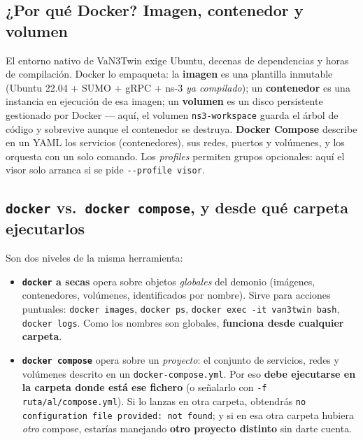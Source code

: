 \documentclass[11pt,a4paper]{article}
\begin{document}
\subsection{¿Por qué Docker? Imagen, contenedor y volumen}

El entorno nativo de VaN3Twin exige Ubuntu, decenas de dependencias y horas
de compilación. Docker lo empaqueta: la \textbf{imagen} es una plantilla
inmutable (Ubuntu 22.04 + SUMO + gRPC + ns-3 \emph{ya compilado}); un
\textbf{contenedor} es una instancia en ejecución de esa imagen; un
\textbf{volumen} es un disco persistente gestionado por Docker --- aquí, el
volumen \texttt{ns3-workspace} guarda el árbol de código y sobrevive aunque
el contenedor se destruya. \textbf{Docker Compose} describe en un YAML los
servicios (contenedores), sus redes, puertos y volúmenes, y los orquesta con
un solo comando. Los \emph{profiles} permiten grupos opcionales: aquí el
visor solo arranca si se pide \texttt{-{}-profile visor}.

\subsection{\texttt{docker} vs.\ \texttt{docker compose}, y desde qué carpeta ejecutarlos}

Son dos niveles de la misma herramienta:

\begin{itemize}[leftmargin=1.6em, itemsep=2pt]
  \item \textbf{\texttt{docker} a secas} opera sobre objetos \emph{globales}
        del demonio (imágenes, contenedores, volúmenes, identificados por
        nombre). Sirve para acciones puntuales: \texttt{docker images},
        \texttt{docker ps}, \texttt{docker exec -it van3twin bash},
        \texttt{docker logs}. Como los nombres son globales,
        \textbf{funciona desde cualquier carpeta}.
  \item \textbf{\texttt{docker compose}} opera sobre un \emph{proyecto}:
        el conjunto de servicios, redes y volúmenes descrito en un
        \texttt{docker-compose.yml}. Por eso \textbf{debe ejecutarse en la
        carpeta donde está ese fichero} (o señalarlo con
        \texttt{-f ruta/al/compose.yml}). Si lo lanzas en otra carpeta,
        obtendrás \texttt{no configuration file provided: not found}; y si en
        esa otra carpeta hubiera \emph{otro} compose, estarías manejando
        \textbf{otro proyecto distinto} sin darte cuenta.
\end{itemize}
\end{document}
